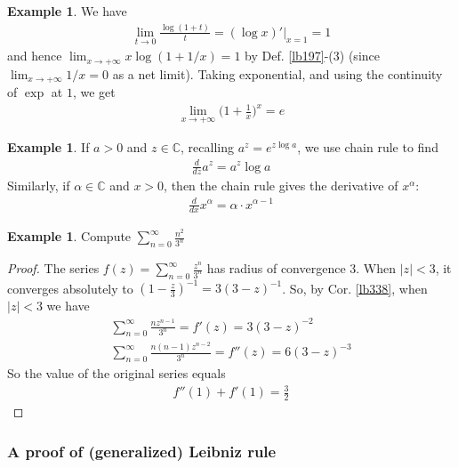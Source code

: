 \documentclass[12pt,b5paper,notitlepage]{article}
\theoremstyle{definition}
\newtheorem{eg}[df]{Example}
\theoremstyle{plain}
\newcommand{\Cbb}{\mathbb C}
\newcommand{\dps}{\displaystyle}
\numberwithin{equation}{section}
\begin{document}
\begin{eg}
We have 
\begin{align*}
\lim_{t\rightarrow 0}\frac{\log(1+t)}t=(\log x)'|_{x=1}=1
\end{align*}
and hence $\lim_{x\rightarrow +\infty}x\log(1+1/x)=1$ by Def. \ref{lb197}-(3) (since $\lim_{x\rightarrow+\infty}1/x=0$ as a net limit). Taking exponential, and using the continuity of $\exp$ at $1$, we get 
\begin{align*}
\lim_{x\rightarrow+\infty}\Big(1+\frac 1x\Big)^x=e
\end{align*} 
\end{eg}




\begin{eg}
If $a>0$ and $z\in\Cbb$, recalling $a^z=e^{z\log a}$, we use chain rule to find
\begin{align*}
\frac d{dz}a^z=a^z\log a
\end{align*}
Similarly, if $\alpha\in\Cbb$ and $x>0$, then the chain rule gives the derivative of $x^\alpha$:
\begin{align*}
\frac d{dx}x^\alpha=\alpha\cdot x^{\alpha-1}
\end{align*}
\end{eg}



\begin{eg}
Compute $\dps\sum_{n=0}^\infty \frac {n^2}{3^n}$
\end{eg}


\begin{proof}
The series $\dps f(z)=\sum_{n=0}^\infty \frac{z^n}{3^n}$ has radius of convergence $3$. When $|z|<3$, it converges absolutely to $(1-\frac z3)^{-1}=3(3-z)^{-1}$. So, by Cor. \ref{lb338}, when $|z|<3$ we have
\begin{gather*}
    \sum_{n=0}^\infty \frac{nz^{n-1}}{3^n}=f'(z)=3(3-z)^{-2}\\
    \sum_{n=0}^\infty \frac{n(n-1)z^{n-2}}{3^n}=f''(z)=6(3-z)^{-3}
\end{gather*}
So the value of the original series equals
\begin{align*}
f''(1)+f'(1)=\frac 32
\end{align*}
\end{proof}


\subsubsection{A proof of (generalized) Leibniz rule}
\end{document}

